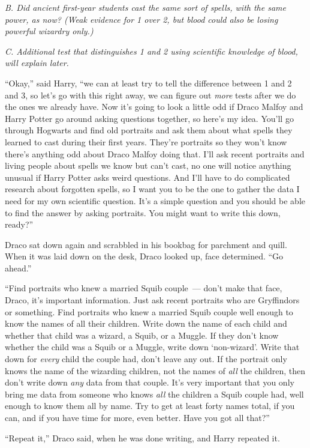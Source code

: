 \emph{B. Did ancient first-year students cast the same sort of spells, with the same power, as now? (Weak evidence for 1 over 2, but blood could also be losing powerful wizardry only.)}

\emph{C. Additional test that distinguishes 1 and 2 using scientific knowledge of blood, will explain later.}

``Okay,'' said Harry, ``we can at least try to tell the difference between 1 and 2 and 3, so let's go with this right away, we can figure out \emph{more} tests after we do the ones we already have. Now it's going to look a little odd if Draco Malfoy and Harry Potter go around asking questions together, so here's my idea. You'll go through Hogwarts and find old portraits and ask them about what spells they learned to cast during their first years. They're portraits so they won't know there's anything odd about Draco Malfoy doing that. I'll ask recent portraits and living people about spells we know but can't cast, no one will notice anything unusual if Harry Potter asks weird questions. And I'll have to do complicated research about forgotten spells, so I want you to be the one to gather the data I need for my own scientific question. It's a simple question and you should be able to find the answer by asking portraits. You might want to write this down, ready?''

Draco sat down again and scrabbled in his bookbag for parchment and quill. When it was laid down on the desk, Draco looked up, face determined. ``Go ahead.''

``Find portraits who knew a married Squib couple~--- don't make that face, Draco, it's important information. Just ask recent portraits who are Gryffindors or something. Find portraits who knew a married Squib couple well enough to know the names of all their children. Write down the name of each child and whether that child was a wizard, a Squib, or a Muggle. If they don't know whether the child was a Squib or a Muggle, write down `non-wizard'. Write that down for \emph{every} child the couple had, don't leave any out. If the portrait only knows the name of the wizarding children, not the names of \emph{all} the children, then don't write down \emph{any} data from that couple. It's very important that you only bring me data from someone who knows \emph{all} the children a Squib couple had, well enough to know them all by name. Try to get at least forty names total, if you can, and if you have time for more, even better. Have you got all that?''

``Repeat it,'' Draco said, when he was done writing, and Harry repeated it.

